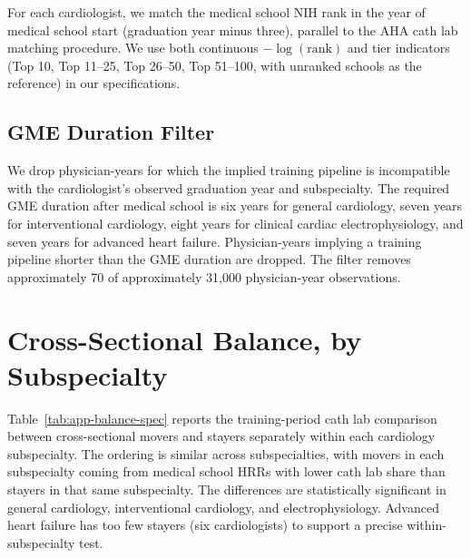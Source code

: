 \documentclass[12pt]{article}
\begin{document}
For each cardiologist, we match the medical school NIH rank in the year of medical school start (graduation year minus three), parallel to the AHA cath lab matching procedure. We use both continuous $-\log(\text{rank})$ and tier indicators (Top 10, Top 11--25, Top 26--50, Top 51--100, with unranked schools as the reference) in our specifications.

\subsection{GME Duration Filter}

We drop physician-years for which the implied training pipeline is incompatible with the cardiologist's observed graduation year and subspecialty. The required GME duration after medical school is six years for general cardiology, seven years for interventional cardiology, eight years for clinical cardiac electrophysiology, and seven years for advanced heart failure. Physician-years implying a training pipeline shorter than the GME duration are dropped. The filter removes approximately 70 of approximately 31{,}000 physician-year observations.

\section{Cross-Sectional Balance, by Subspecialty}\label{sec:app-balance}

Table~\ref{tab:app-balance-spec} reports the training-period cath lab comparison between cross-sectional movers and stayers separately within each cardiology subspecialty. The ordering is similar across subspecialties, with movers in each subspecialty coming from medical school HRRs with lower cath lab share than stayers in that same subspecialty. The differences are statistically significant in general cardiology, interventional cardiology, and electrophysiology. Advanced heart failure has too few stayers (six cardiologists) to support a precise within-subspecialty test.
\end{document}
